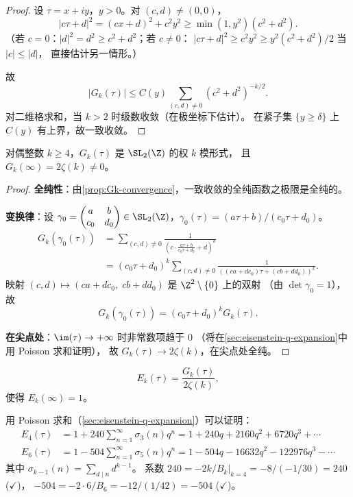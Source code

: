 \begin{proof}
设 $\tau = x + iy$，$y > 0$。对 $(c, d) \neq (0, 0)$，
\[
  |c\tau + d|^2 = (cx + d)^2 + c^2 y^2 \geq \min(1, y^2)(c^2 + d^2).
\]
（若 $c = 0$：$|d|^2 = d^2 \geq c^2+d^2$；若 $c \neq 0$：
$|c\tau+d|^2 \geq c^2y^2 \geq y^2(c^2+d^2)/2$ 当 $|c| \leq |d|$，
直接估计另一情形。）

故
\[
  |G_k(\tau)| \leq C(y) \sum_{(c,d) \neq 0} (c^2 + d^2)^{-k/2}.
\]
对二维格求和，当 $k > 2$ 时级数收敛（在极坐标下估计）。
在紧子集 $\{y \geq \delta\}$ 上 $C(y)$ 有上界，故一致收敛。
\end{proof}

\begin{theorem}[$G_k$ 是模形式]
\label{thm:Gk-modular}
对偶整数 $k \geq 4$，$G_k(\tau)$ 是 $\SL_2(\Z)$ 的权 $k$ 模形式，
且 $G_k(\infty) = 2\zeta(k) \neq 0$。
\end{theorem}

\begin{proof}
\textbf{全纯性}：由\cref{prop:Gk-convergence}，一致收敛的全纯函数之极限是全纯的。

\textbf{变换律}：设 $\gamma_0 = \begin{pmatrix} a & b \\ c_0 & d_0 \end{pmatrix}
\in \SL_2(\Z)$，$\gamma_0(\tau) = (a\tau + b)/(c_0\tau + d_0)$。
\begin{align}
  G_k(\gamma_0(\tau))
  &= \sum_{(c,d) \neq 0} \frac{1}{\!\left(c \cdot \frac{a\tau+b}{c_0\tau+d_0} + d\right)^{\!k}} \\
  &= (c_0\tau + d_0)^k
     \sum_{(c,d) \neq 0} \frac{1}{((ca + dc_0)\tau + (cb + dd_0))^k}.
\end{align}
映射 $(c, d) \mapsto (ca+dc_0,\; cb+dd_0)$ 是 $\Z^2 \setminus \{0\}$ 上的双射
（由 $\det\gamma_0 = 1$），故
\[
  G_k(\gamma_0(\tau)) = (c_0\tau + d_0)^k G_k(\tau).
\]

\textbf{在尖点处}：$\im(\tau) \to +\infty$ 时非常数项趋于 $0$
（将在\cref{sec:eisenstein-q-expansion}中用 Poisson 求和证明），
故 $G_k(\tau) \to 2\zeta(k)$，在尖点处全纯。
\end{proof}

\begin{definition}
\label{def:normalized-eisenstein}
\[
  E_k(\tau) = \frac{G_k(\tau)}{2\zeta(k)},
\]
使得 $E_k(\infty) = 1$。
\end{definition}

\begin{example}[$E_4, E_6$ 的展开（预告）]
\label{ex:E4-E6-expansion}
用 Poisson 求和（\cref{sec:eisenstein-q-expansion}）可以证明：
\begin{align*}
  E_4(\tau) &= 1 + 240\sum_{n=1}^{\infty} \sigma_3(n) q^n
  = 1 + 240q + 2160q^2 + 6720q^3 + \cdots \\
  E_6(\tau) &= 1 - 504\sum_{n=1}^{\infty} \sigma_5(n) q^n
  = 1 - 504q - 16632q^2 - 122976q^3 - \cdots
\end{align*}
其中 $\sigma_{k-1}(n) = \sum_{d \mid n} d^{k-1}$。
系数 $240 = -2k/B_k|_{k=4} = -8/(-1/30) = 240$ ($\checkmark$)，
$-504 = -2 \cdot 6 / B_6 = -12 / (1/42) = -504$ ($\checkmark$)。
\end{example}

